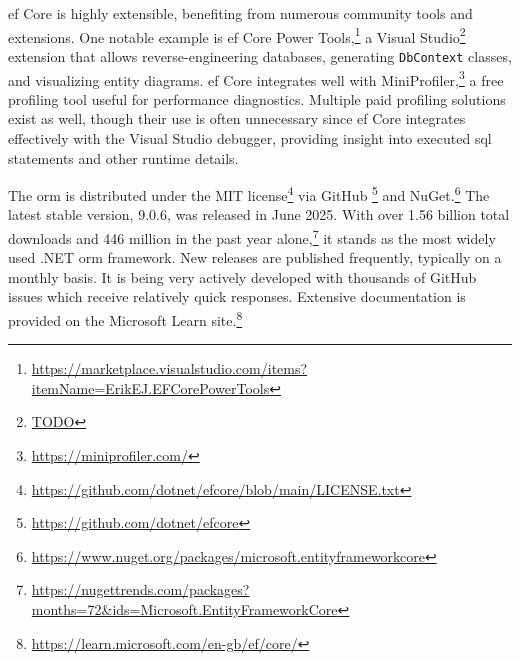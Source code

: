 \acrshort{ef} Core is highly extensible, benefiting from numerous community tools and extensions. One notable example is \acrshort{ef} Core Power Tools,\footnote{\url{https://marketplace.visualstudio.com/items?itemName=ErikEJ.EFCorePowerTools}} a Visual Studio\footnote{\url{TODO}} extension that allows reverse-engineering databases, generating \texttt{DbContext} classes, and visualizing entity diagrams. \acrshort{ef} Core integrates well with MiniProfiler,\footnote{\url{https://miniprofiler.com/}} a free profiling tool useful for performance diagnostics. Multiple paid profiling solutions exist as well, though their use is often unnecessary since \acrshort{ef} Core integrates effectively with the Visual Studio debugger, providing insight into executed \acrshort{sql} statements and other runtime details.


The \acrshort{orm} is distributed under the MIT license\footnote{\url{https://github.com/dotnet/efcore/blob/main/LICENSE.txt}} via GitHub \footnote{\url{https://github.com/dotnet/efcore}} and NuGet.\footnote{\url{https://www.nuget.org/packages/microsoft.entityframeworkcore}} The latest stable version, 9.0.6, was released in June 2025. With over 1.56 billion total downloads and 446 million in the past year alone,\footnote{\url{https://nugettrends.com/packages?months=72&ids=Microsoft.EntityFrameworkCore}} it stands as the most widely used .NET \acrshort{orm} framework. New releases are published frequently, typically on a monthly basis. It is being very actively developed with thousands of GitHub issues which receive relatively quick responses. Extensive documentation is provided on the Microsoft Learn site.\footnote{\url{https://learn.microsoft.com/en-gb/ef/core/}}

